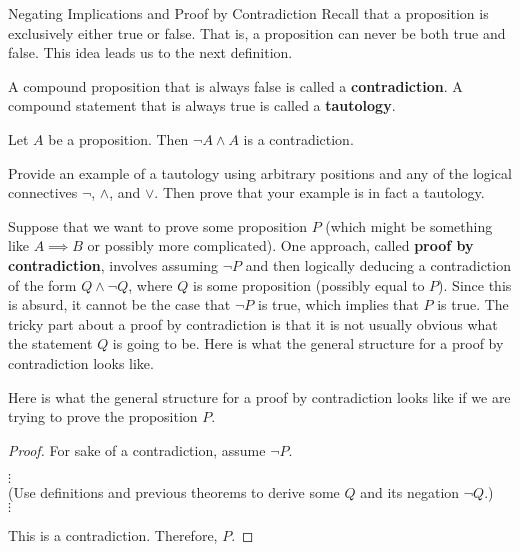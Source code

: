 \begin{section}{Negating Implications and Proof by Contradiction}
Recall that a proposition is exclusively either true or false.  That is, a proposition can never be both true and false.  This idea leads us to the next definition.

\begin{definition}
A compound proposition that is always false is called a \textbf{contradiction}.  A compound statement that is always true is called a \textbf{tautology}.
\end{definition}

\begin{theorem}
Let $A$ be a proposition. Then $\neg A\wedge A$ is a contradiction.
\end{theorem}

\begin{exercise}
Provide an example of a tautology using arbitrary positions and any of the logical connectives $\neg$, $\wedge$, and $\vee$.  Then prove that your example is in fact a tautology.
\end{exercise}

Suppose that we want to prove some proposition $P$ (which might be something like $A\implies B$ or possibly more complicated).  One approach, called \textbf{proof by contradiction}, involves assuming $\neg P$ and then logically deducing a contradiction of the form $Q\wedge \neg Q$, where $Q$ is some proposition (possibly equal to $P$).  Since this is absurd, it cannot be the case that $\neg P$ is true, which implies that $P$ is true.  The tricky part about a proof by contradiction is that it is not usually obvious what the statement $Q$ is going to be.  Here is what the general structure for a proof by contradiction looks like.

\bigskip

\begin{skeleton}
Here is what the general structure for a proof by contradiction looks like if we are trying to prove the proposition $P$.

\bigskip

\begin{textbox}
\begin{proof}
For sake of a contradiction, assume $\neg P$.
\begin{center}
$\vdots$\\
(Use definitions and previous theorems to derive some $Q$ and its negation $\neg Q$.)\\
$\vdots$
\end{center}
\noindent This is a contradiction.  Therefore, $P$.
\end{proof}
\end{textbox}


\end{skeleton}
\end{section}

